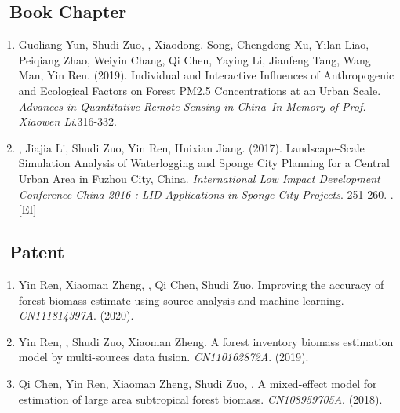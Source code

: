 \subsection*{\texorpdfstring{\faBook\ Book Chapter}{Book Chapter}}
\begin{enumerate}
\item
    Guoliang Yun, Shudi Zuo, \Shaoqing, Xiaodong. Song, Chengdong Xu, Yilan Liao, Peiqiang Zhao, Weiyin Chang, Qi Chen, Yaying Li, Jianfeng Tang, Wang Man, Yin Ren. (2019).
	Individual and Interactive Influences of Anthropogenic and Ecological Factors on Forest PM2.5 Concentrations at an Urban Scale.
    \textit{Advances in Quantitative Remote Sensing in China–In Memory of Prof. Xiaowen Li}.316-332.
\item
    \Shaoqing, Jiajia Li, Shudi Zuo, Yin Ren, Huixian Jiang. (2017).
	Landscape-Scale Simulation Analysis of Waterlogging and Sponge City Planning for a Central Urban Area in Fuzhou City, China.
    \textit{International Low Impact Development Conference China 2016 : LID Applications in Sponge City Projects}. 251-260.
    . [EI]
\end{enumerate}

\subsection*{\texorpdfstring{\faBook\ Patent}{Patent}}
\begin{enumerate}
\item
     Yin Ren, Xiaoman Zheng, \Shaoqing, Qi Chen, Shudi Zuo.
     Improving the accuracy of forest biomass estimate using source analysis and machine learning.
     \textit{CN111814397A}. (2020).
\item
     Yin Ren, \Shaoqing, Shudi Zuo, Xiaoman Zheng.
     A forest inventory biomass estimation model by multi-sources data fusion.
     \textit{CN110162872A}. (2019).
\item
     Qi Chen, Yin Ren, Xiaoman Zheng, Shudi Zuo, \Shaoqing.
     A mixed-effect model for estimation of large area subtropical forest biomass.
     \textit{CN108959705A}. (2018).
\end{enumerate}

